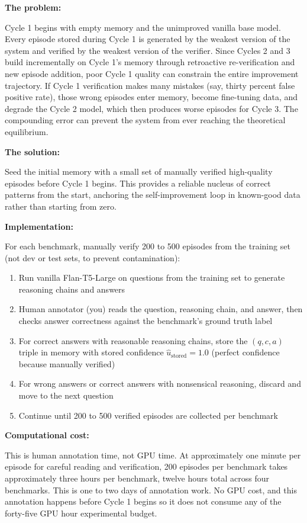\documentclass[11pt,a4paper]{article}
\newcommand{\implementbox}[2]{%
\begin{tcolorbox}[enhanced,breakable,
  colback=LightSlate,colframe=Slate,boxrule=1.5pt,arc=4pt,
  left=8pt,right=8pt,top=6pt,bottom=6pt,
  title={\bfseries\small\color{white}#1},
  attach boxed title to top left={yshift=-2mm,xshift=6mm},
  boxed title style={colback=Slate,arc=3pt,boxrule=0pt,
    left=4pt,right=4pt,top=2pt,bottom=2pt}]
#2
\end{tcolorbox}}
\newcommand{\ustored}{\hat{u}_{\text{stored}}}
\begin{document}
\implementbox{IMPLEMENTATION CONCERN 2: Initial Memory Seeding to Prevent Weak Cycle 1}{
\textbf{The problem:}

Cycle 1 begins with empty memory and the unimproved vanilla base model. Every episode stored during Cycle 1 is generated by the weakest version of the system and verified by the weakest version of the verifier. Since Cycles 2 and 3 build incrementally on Cycle 1's memory through retroactive re-verification and new episode addition, poor Cycle 1 quality can constrain the entire improvement trajectory. If Cycle 1 verification makes many mistakes (say, thirty percent false positive rate), those wrong episodes enter memory, become fine-tuning data, and degrade the Cycle 2 model, which then produces worse episodes for Cycle 3. The compounding error can prevent the system from ever reaching the theoretical equilibrium.

\textbf{The solution:}

Seed the initial memory with a small set of manually verified high-quality episodes before Cycle 1 begins. This provides a reliable nucleus of correct patterns from the start, anchoring the self-improvement loop in known-good data rather than starting from zero.

\textbf{Implementation:}

For each benchmark, manually verify 200 to 500 episodes from the training set (not dev or test sets, to prevent contamination):
\begin{enumerate}
\item Run vanilla Flan-T5-Large on questions from the training set to generate reasoning chains and answers
\item Human annotator (you) reads the question, reasoning chain, and answer, then checks answer correctness against the benchmark's ground truth label
\item For correct answers with reasonable reasoning chains, store the $(q, c, a)$ triple in memory with stored confidence $\ustored = 1.0$ (perfect confidence because manually verified)
\item For wrong answers or correct answers with nonsensical reasoning, discard and move to the next question
\item Continue until 200 to 500 verified episodes are collected per benchmark
\end{enumerate}

\textbf{Computational cost:}

This is human annotation time, not GPU time. At approximately one minute per episode for careful reading and verification, 200 episodes per benchmark takes approximately three hours per benchmark, twelve hours total across four benchmarks. This is one to two days of annotation work. No GPU cost, and this annotation happens before Cycle 1 begins so it does not consume any of the forty-five GPU hour experimental budget.

}
\end{document}
